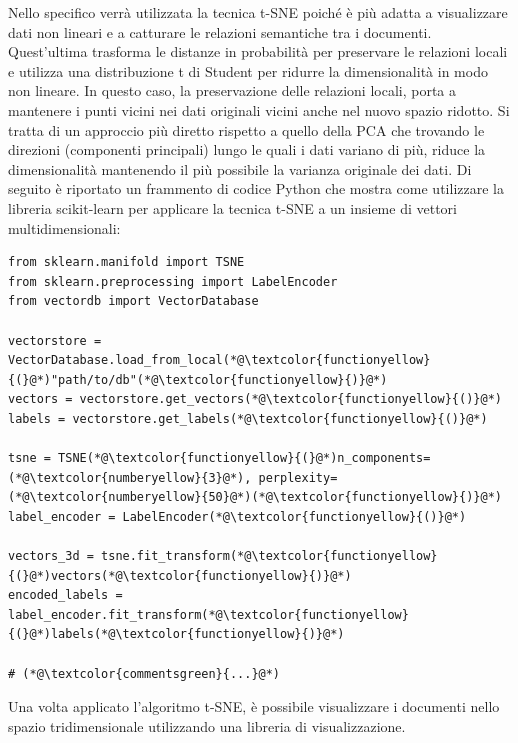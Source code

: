 Nello specifico verrà utilizzata la tecnica t-SNE poiché è più adatta a visualizzare dati non lineari e a catturare le relazioni semantiche tra i documenti.
Quest'ultima trasforma le distanze in probabilità per preservare le relazioni locali e utilizza una distribuzione t di Student per ridurre la dimensionalità in modo non lineare. In questo caso, la preservazione delle relazioni locali, porta a mantenere i punti vicini nei dati originali vicini anche nel nuovo spazio ridotto.
Si tratta di un approccio più diretto rispetto a quello della PCA che trovando le direzioni (componenti principali) lungo le quali i dati variano di più, riduce la dimensionalità mantenendo il più possibile la varianza originale dei dati.
Di seguito è riportato un frammento di codice Python che mostra come utilizzare la libreria scikit-learn per applicare la tecnica t-SNE \cite{scikittsne} a un insieme di vettori multidimensionali:
\begin{lstlisting}[label=lst:tsne, caption={Esempio applicazione t-SNE}]  
from sklearn.manifold import TSNE
from sklearn.preprocessing import LabelEncoder
from vectordb import VectorDatabase

vectorstore = VectorDatabase.load_from_local(*@\textcolor{functionyellow}{(}@*)"path/to/db"(*@\textcolor{functionyellow}{)}@*)
vectors = vectorstore.get_vectors(*@\textcolor{functionyellow}{()}@*)
labels = vectorstore.get_labels(*@\textcolor{functionyellow}{()}@*)

tsne = TSNE(*@\textcolor{functionyellow}{(}@*)n_components=(*@\textcolor{numberyellow}{3}@*), perplexity=(*@\textcolor{numberyellow}{50}@*)(*@\textcolor{functionyellow}{)}@*)
label_encoder = LabelEncoder(*@\textcolor{functionyellow}{()}@*)

vectors_3d = tsne.fit_transform(*@\textcolor{functionyellow}{(}@*)vectors(*@\textcolor{functionyellow}{)}@*)
encoded_labels = label_encoder.fit_transform(*@\textcolor{functionyellow}{(}@*)labels(*@\textcolor{functionyellow}{)}@*)

# (*@\textcolor{commentsgreen}{...}@*)
\end{lstlisting}
Una volta applicato l'algoritmo t-SNE, è possibile visualizzare i documenti nello spazio tridimensionale utilizzando una libreria di visualizzazione.
